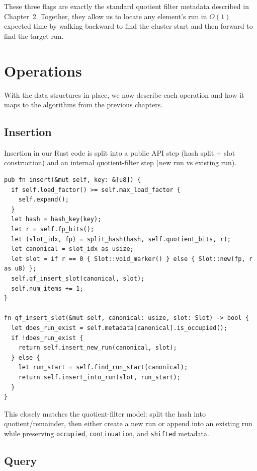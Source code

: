 These three flags are exactly the standard quotient filter metadata described in Chapter~2. Together, they allow us to locate any element's run in $O(1)$ expected time by walking backward to find the cluster start and then forward to find the target run.

\section{Operations}

With the data structures in place, we now describe each operation and how it maps to the algorithms from the previous chapters.

\subsection{Insertion}

Insertion in our Rust code is split into a public API step (hash split + slot construction) and an internal quotient-filter step (new run vs existing run).

\begin{lstlisting}[caption={Insertion path in our Rust implementation}]
pub fn insert(&mut self, key: &[u8]) {
  if self.load_factor() >= self.max_load_factor {
    self.expand();
  }
  let hash = hash_key(key);
  let r = self.fp_bits();
  let (slot_idx, fp) = split_hash(hash, self.quotient_bits, r);
  let canonical = slot_idx as usize;
  let slot = if r == 0 { Slot::void_marker() } else { Slot::new(fp, r as u8) };
  self.qf_insert_slot(canonical, slot);
  self.num_items += 1;
}

fn qf_insert_slot(&mut self, canonical: usize, slot: Slot) -> bool {
  let does_run_exist = self.metadata[canonical].is_occupied();
  if !does_run_exist {
    return self.insert_new_run(canonical, slot);
  } else {
    let run_start = self.find_run_start(canonical);
    return self.insert_into_run(slot, run_start);
  }
}
\end{lstlisting}

This closely matches the quotient-filter model: split the hash into quotient/remainder, then either create a new run or append into an existing run while preserving \texttt{occupied}, \texttt{continuation}, and \texttt{shifted} metadata.

\subsection{Query}

